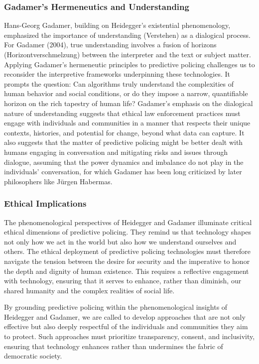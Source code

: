 \documentclass[man, noextraspace]{apa7} %
\begin{document}
\subsubsection{Gadamer's Hermeneutics and Understanding
}
Hans-Georg Gadamer, building on Heidegger's existential phenomenology, emphasized the importance of understanding (Verstehen) as a dialogical process. For Gadamer (2004), true understanding involves a fusion of horizons (Horizontverschmelzung) between the interpreter and the text or subject matter. Applying Gadamer's hermeneutic principles to predictive policing challenges us to reconsider the interpretive frameworks underpinning these technologies. It prompts the question: Can algorithms truly understand the complexities of human behavior and social conditions, or do they impose a narrow, quantifiable horizon on the rich tapestry of human life? Gadamer's emphasis on the dialogical nature of understanding suggests that ethical law enforcement practices must engage with individuals and communities in a manner that respects their unique contexts, histories, and potential for change, beyond what data can capture. It also suggests that the matter of predictive policing might be better dealt with humans engaging in conversation and mitigating risks and issues through dialogue, assuming that the power dynamics and imbalance do not play in the individuals' conversation, for which Gadamer has been long criticized by later philosophers like Jürgen Habermas.

\subsubsection{Ethical Implications}
The phenomenological perspectives of Heidegger and Gadamer illuminate critical ethical dimensions of predictive policing. They remind us that technology shapes not only how we act in the world but also how we understand ourselves and others. The ethical deployment of predictive policing technologies must therefore navigate the tension between the desire for security and the imperative to honor the depth and dignity of human existence. This requires a reflective engagement with technology, ensuring that it serves to enhance, rather than diminish, our shared humanity and the complex realities of social life.

By grounding predictive policing within the phenomenological insights of Heidegger and Gadamer, we are called to develop approaches that are not only effective but also deeply respectful of the individuals and communities they aim to protect. Such approaches must prioritize transparency, consent, and inclusivity, ensuring that technology enhances rather than undermines the fabric of democratic society. \vspace{1cm}
\end{document}
